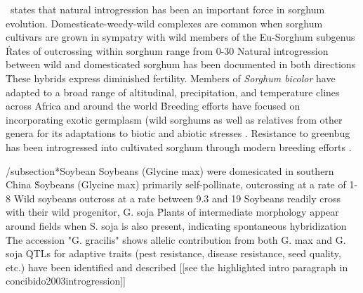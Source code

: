 \documentclass[11pt]{article}
\begin{document}
\cite{po1982sorghum}\ states that natural introgression has been an important force in sorghum evolution.
Domesticate-weedy-wild complexes are common when sorghum cultivars are grown in sympatry with wild members of the Eu-Sorghum subgenus \cite{de1978systematics, doggett1968disruptive, baker1972human}\.
Rates of outcrossing within sorghum range from 0-30%
Natural introgression between wild and domesticated sorghum has been documented in both directions \cite{kuhlman2006interspecific, aldrich1992restriction, aldrich1992patterns, doggett1988sorghum, baker1972migrations}\.
These hybrids express diminished fertility.
Members of \emph{Sorghum bicolor} have adapted to a broad range of altitudinal, precipitation, and temperature clines across Africa and around the world \cite{po1982sorghum, CWR}\.
Breeding efforts have focused on incorporating exotic germplasm (wild sorghums as well as relatives from other genera \cite{de1976cytogenetics} for its adaptations to biotic and abiotic stresses \cite{reddy2006current, po1982sorghum, johnson1979breeding}.
Resistance to greenbug has been introgressed into cultivated sorghum through modern breeding efforts \cite{johnson1979breeding}.















/subsection*{Soybean}
Soybeans (Glycine max) were domesicated in southern China \cite{guo2010single}\.
Soybeans (Glycine max) primarily self-pollinate, outcrossing at a rate of 1-8%
Wild soybeans outcross at a rate between 9.3 and 19%
Soybeans readily cross with their wild progenitor, G. soja \cite{singh1988genomic}\.
Plants of intermediate morphology appear around fields when S. soja is also present, indicating spontaneous hybridization \cite{kwon1972studies}\.
The accession "G. gracilis" shows allelic contribution from both G. max and G. soja \cite{keim1989restriction}\.
QTLs for adaptive traits (pest resistance, disease resistance, seed quality, etc.) have been identified and described [[see the highlighted intro paragraph in concibido2003introgression]]
\end{document}
